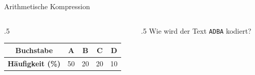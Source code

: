 \begin{frame}[fragile]{Arithmetische Kompression}
\begin{columns}
\begin{column}{.5\textwidth}
\begin{table}[H]
\centering
\footnotesize
\begin{tabular}{ccccc}
\textbf{Buchstabe} & A & B & C & D \\\midrule
\textbf{Häufigkeit (\%)} & 50 & 20 & 20 & 10 \\
\end{tabular}
\end{table}
\end{column}
\begin{column}{.5\textwidth}
Wie wird der Text \texttt{ADBA} kodiert?
\end{column}
\end{columns}
\vspace{-.5cm}
\newcommand{\arithmeticTikz}[7]{
    \draw (0,#1) -- (10,#1);


    \foreach \i in {1,...,4}{
	    \pgfmathsetmacro{\inc}{#2[\i-1]} %
	    \pgfmathsetmacro{\xStart}{#3[\i-1]} %
	    \pgfmathsetmacro{\xEnd}{\xStart+\inc} %
	    \pgfmathsetmacro{\l}{#4[\i-1]} %

        \draw (\xStart*10,#1+0.2) to (\xStart*10,#1-0.2);
        \draw (\xEnd*10,#1+0.2) to (\xEnd*10,#1-0.2);

        \node (\l-Perc) at (\xStart*10,#1-0.4) {\fpeval{round(((1-\xStart)*#6+#7*\xStart),4)}};
        \node (\l-PercEnd) at (\xEnd*10,#1-0.4) {\fpeval{round(((1-\xEnd)*#6+#7*\xEnd),4)}};

}}
\end{frame}
